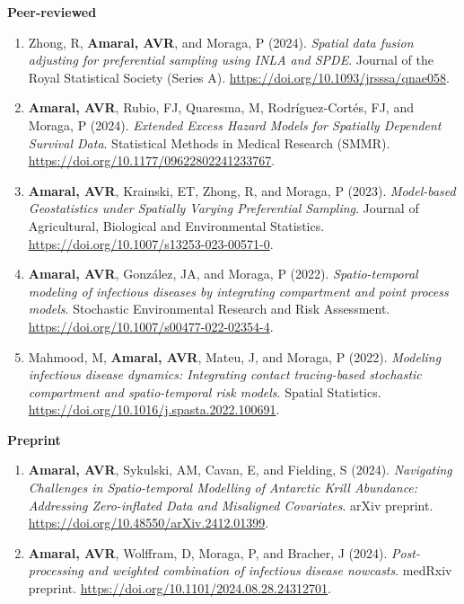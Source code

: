 \documentclass[10pt, ]{article}
\begin{document}
	\textbf{Peer-reviewed} \vspace{-5pt}
	
	\begin{enumerate}[label*=\arabic*., noitemsep]
		\item  Zhong, R, \textbf{Amaral, AVR}, and Moraga, P (2024). \textit{ Spatial data fusion adjusting for preferential sampling using INLA and SPDE}. Journal of the Royal Statistical Society (Series A). \url{https://doi.org/10.1093/jrsssa/qnae058}. 
		\item  \textbf{Amaral, AVR}, Rubio, FJ, Quaresma, M, Rodríguez-Cortés, FJ, and Moraga, P (2024). \textit{Extended Excess Hazard Models for Spatially Dependent Survival Data}. Statistical Methods in Medical Research (SMMR). \url{https://doi.org/10.1177/09622802241233767}.
		\item  \textbf{Amaral, AVR}, Krainski, ET, Zhong, R, and Moraga, P (2023). \textit{Model-based Geostatistics under Spatially Varying Preferential Sampling}.  Journal of Agricultural, Biological and Environmental Statistics. \url{https://doi.org/10.1007/s13253-023-00571-0}.
		\item  \textbf{Amaral, AVR}, González, JA, and Moraga, P (2022). \textit{Spatio-temporal modeling of infectious diseases by integrating compartment and point process models}. Stochastic Environmental Research and Risk Assessment. \url{https://doi.org/10.1007/s00477-022-02354-4}.
		\item  Mahmood, M, \textbf{Amaral, AVR}, Mateu, J, and Moraga, P (2022). \textit{Modeling infectious disease dynamics: Integrating contact tracing-based stochastic compartment and spatio-temporal risk models}. Spatial Statistics. \url{https://doi.org/10.1016/j.spasta.2022.100691}.
	\end{enumerate} \vspace{-5pt}

	\noindent\textbf{Preprint} \vspace{-5pt}

	\begin{enumerate}[label*=\arabic*., noitemsep]
		\item \textbf{Amaral, AVR}, Sykulski, AM, Cavan, E, and Fielding, S (2024). \textit{Navigating Challenges in Spatio-temporal Modelling of Antarctic Krill Abundance: Addressing Zero-inflated Data and Misaligned Covariates}. arXiv preprint. \url{https://doi.org/10.48550/arXiv.2412.01399}.			
		\item \textbf{Amaral, AVR}, Wolffram, D, Moraga, P, and Bracher, J (2024). \textit{Post-processing and weighted combination of infectious disease nowcasts}. medRxiv preprint. \url{https://doi.org/10.1101/2024.08.28.24312701}.			
	\end{enumerate}
	\vspace{-2pt}
	
\end{document}
